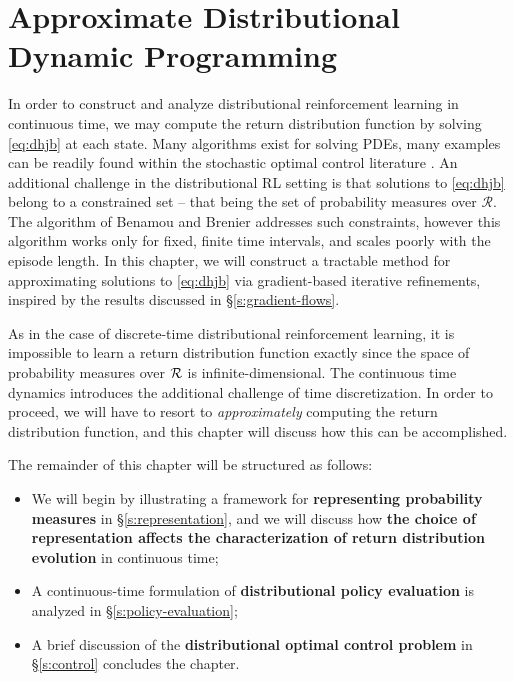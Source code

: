 \chapter{Approximate Distributional Dynamic Programming}\label{c:approximate-dp}

In order to construct and analyze distributional reinforcement
learning in continuous time, we may compute the return distribution
function by solving \eqref{eq:dhjb} at each state. Many algorithms exist for
solving PDEs, many examples can be readily found within the stochastic optimal
control literature \citep{fleming2006controlled}. An additional challenge in the
distributional RL setting is that solutions to \eqref{eq:dhjb} belong to a
constrained set -- that being the set of probability measures over
$\mathcal{R}$. The algorithm of Benamou and Brenier
\citep{benamou2000computational} addresses such constraints, however this
algorithm works only for fixed, finite time intervals, and scales poorly with
the episode length. In this chapter, we will construct a tractable method for
approximating solutions to \eqref{eq:dhjb} via gradient-based iterative
refinements, inspired by the results discussed in \S\ref{s:gradient-flows}.

As in the case of discrete-time distributional reinforcement learning,
it is impossible to learn a return distribution function exactly since the space
of probability measures over $\operatorname{\mathcal{R}}$ is infinite-dimensional. The
continuous time dynamics introduces the additional challenge of time
discretization. In order to proceed, we will have to resort to
\emph{approximately} computing the return distribution function, and this
chapter will discuss how this can be accomplished.

The remainder of this chapter will be structured as follows:

\begin{itemize}
  \item We will begin by
illustrating a framework for \textbf{representing probability measures} in
\S\ref{s:representation}, and we will discuss how \textbf{the choice of
  representation affects the characterization of return distribution evolution}
  in continuous time;
  \item A continuous-time formulation of \textbf{distributional policy
      evaluation} is
    analyzed in \S\ref{s:policy-evaluation};
  \item A brief discussion of the \textbf{distributional optimal control problem}
    in \S\ref{s:control} concludes the chapter.
\end{itemize}

